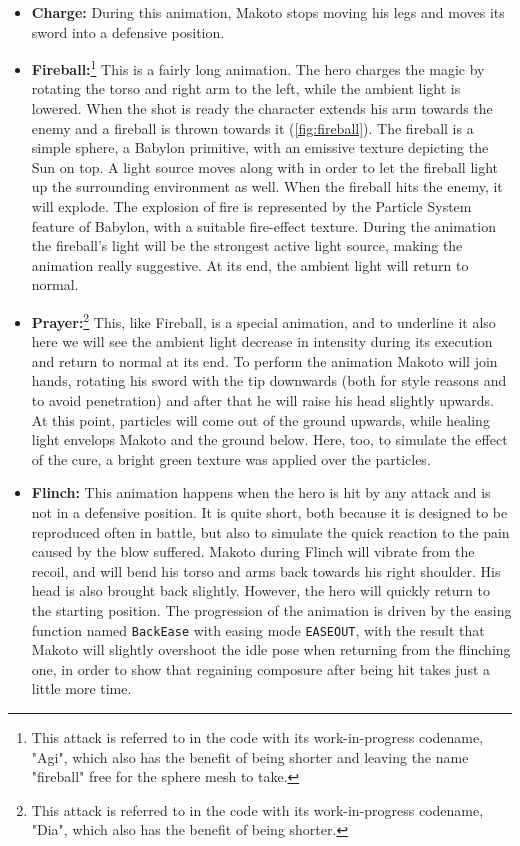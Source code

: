 \begin{itemize}
    \item \textbf{Charge:} During this animation, Makoto stops moving his legs and moves its sword into a defensive position.

    \item \textbf{Fireball:}\footnote{This attack is referred to in the code with its work-in-progress codename, "Agi", which also has the benefit of being shorter and leaving the name "fireball" free for the sphere mesh to take.} This is a fairly long animation. The hero charges the magic by rotating the torso and right arm to the left, while the ambient light is lowered. When the shot is ready the character extends his arm towards the enemy and a fireball is thrown towards it (\autoref*{fig:fireball}). The fireball is a simple sphere, a Babylon primitive, with an emissive texture depicting the Sun on top. A light source moves along with in order to let the fireball light up the surrounding environment as well. When the fireball hits the enemy, it will explode. The explosion of fire is represented by the Particle System feature of Babylon, with a suitable fire-effect texture. During the animation the fireball's light will be the strongest active light source, making the animation really suggestive. At its end, the ambient light will return to normal.
    
    \item \textbf{Prayer:}\footnote{This attack is referred to in the code with its work-in-progress codename, "Dia", which also has the benefit of being shorter.} This, like Fireball, is a special animation, and to underline it also here we will see the ambient light decrease in intensity during its execution and return to normal at its end. To perform the animation Makoto will join hands, rotating his sword with the tip downwards (both for style reasons and to avoid penetration) and after that he will raise his head slightly upwards. At this point, particles will come out of the ground upwards, while healing light envelops Makoto and the ground below. Here, too, to simulate the effect of the cure, a bright green texture was applied over the particles.
    
    \item \textbf{Flinch:} This animation happens when the hero is hit by any attack and is not in a defensive position. It is quite short, both because it is designed to be reproduced often in battle, but also to simulate the quick reaction to the pain caused by the blow suffered. Makoto during Flinch will vibrate from the recoil, and will bend his torso and arms back towards his right shoulder. His head is also brought back slightly. However, the hero will quickly return to the starting position. The progression of the animation is driven by the easing function named \texttt{BackEase} with easing mode \texttt{EASEOUT}, with the result that Makoto will slightly overshoot the idle pose when returning from the flinching one, in order to show that regaining composure after being hit takes just a little more time.
    

\end{itemize}
